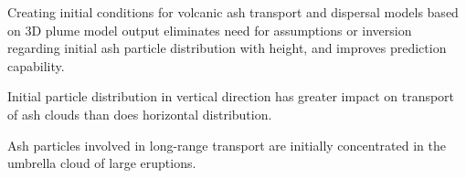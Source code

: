 \documentclass[draft,linenumbers]{agujournal2019}
\begin{document}




\begin{keypoints}
  \item Creating initial conditions for volcanic ash transport and dispersal models based on 3D plume model output eliminates need for assumptions or inversion regarding initial ash particle distribution with height, and improves prediction capability.
\item Initial particle distribution in vertical direction has greater impact on transport of ash clouds than does horizontal distribution.
\item Ash particles involved in long-range transport are initially concentrated in the umbrella cloud of large eruptions.
\end{keypoints}

%
%

\end{document}

